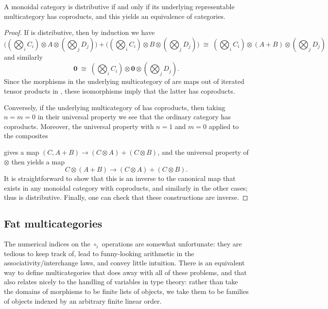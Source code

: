 \documentclass{book}
\def\zero{\mathbf{0}}
\let\tensor\otimes
\begin{document}
\begin{thm}\label{thm:multicat-coprod}
  A monoidal category is distributive if and only if its underlying representable multicategory has coproducts, and this yields an equivalence of categories.
\end{thm}
\begin{proof}
  If \cM is distributive, then by induction we have
  \[ \textstyle
  \Big((\bigotimes_i C_i)\tensor A \tensor (\bigotimes_j D_j)\Big) +
  \Big((\bigotimes_i C_i)\tensor B \tensor (\bigotimes_j D_j)\Big)
  \;\cong\;
  (\bigotimes_i C_i)\tensor (A+B) \tensor (\bigotimes_j D_j)
  \]
  and similarly
  \[ \zero \;\cong\; \textstyle (\bigotimes_i C_i)\tensor \zero \tensor (\bigotimes_j D_j).\]
  Since the morphisms in the underlying multicategory of \cM are maps out of iterated tensor products in \cM, these isomorphisms imply that the latter has coproducts.

  Conversely, if the underlying multicategory of \cM has coproducts, then taking $n=m=0$ in their universal property we see that the ordinary category \cM has coproducts.
  Moreover, the universal property with $n=1$ and $m=0$ applied to the composites
  gives a map $(C,A+B) \to (C\tensor A)+(C\tensor B)$, and the universal property of $\tensor$ then yields a map
  \[C\tensor(A+B) \to (C\tensor A)+(C\tensor B). \]
  It is straightforward to show that this is an inverse to the canonical map that exists in any monoidal category with coproducts, and similarly in the other cases; thus \cM is distributive.
  Finally, one can check that these constructions are inverse.
\end{proof}

\subsection{Fat multicategories}
\label{sec:fat-multicats}

The numerical indices on the $\circ_i$ operations are somewhat unfortunate: they are tedious to keep track of, lead to funny-looking arithmetic in the associativity/interchange laws, and convey little intuition.
There is an equivalent way to define multicategories that does away with all of these problems, and that also relates nicely to the handling of variables in type theory: rather than take the domains of morphisms to be finite lists of objects, we take them to be families of objects indexed by an arbitrary finite linear order.
\end{document}
